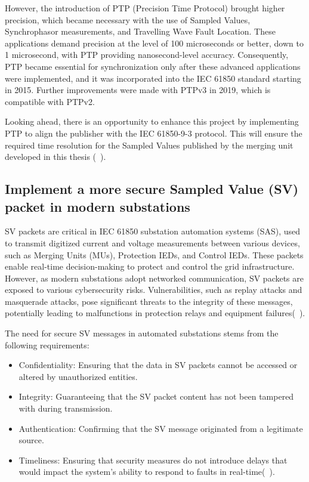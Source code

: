 However, the introduction of PTP (Precision Time Protocol) brought higher precision, which became necessary with the use of Sampled Values, Synchrophasor measurements, and Travelling Wave Fault Location. These applications demand precision at the level of 100 microseconds or better, down to 1 microsecond, with PTP providing nanosecond-level accuracy. Consequently, PTP became essential for synchronization only after these advanced applications were implemented, and it was incorporated into the IEC 61850 standard starting in 2015. Further improvements were made with PTPv3 in 2019, which is compatible with PTPv2.

Looking ahead, there is an opportunity to enhance this project by implementing PTP to align the publisher with the IEC 61850-9-3 protocol. This will ensure the required time resolution for the Sampled Values published by the merging unit developed in this thesis (~\cite{baumgartner2024iec}).
			
\subsection{Implement a more secure Sampled Value (SV) packet in modern substations}

SV packets are critical in IEC 61850 substation automation systems (SAS), used to transmit digitized current and voltage measurements between various devices, such as Merging Units (MUs), Protection IEDs, and Control IEDs. These packets enable real-time decision-making to protect and control the grid infrastructure. However, as modern substations adopt networked communication, SV packets are exposed to various cybersecurity risks. Vulnerabilities, such as replay attacks and masquerade attacks, pose significant threats to the integrity of these messages, potentially leading to malfunctions in protection relays and equipment failures(~\cite{hussain2024security}).

The need for secure SV messages in automated substations stems from the following requirements:
\begin{itemize}
	\item Confidentiality: Ensuring that the data in SV packets cannot be accessed or altered by unauthorized entities.
	\item Integrity: Guaranteeing that the SV packet content has not been tampered with during transmission.
	\item Authentication: Confirming that the SV message originated from a legitimate source. 
	\item Timeliness: Ensuring that security measures do not introduce delays that would impact the system's ability to respond to faults in real-time(~\cite{hussain2024security}).
\end{itemize}

